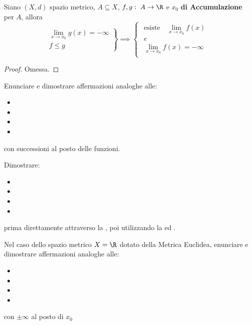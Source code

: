 \begin{proposition}
	\label{prop:f_leq_g_lim_g_meno_inf_allora_f_meno_inf}
	Siano $(X,d)$ spazio metrico, $A \subseteq X$, $f,g:\; A \to \R$ e $x_0$ \textbf{di Accumulazione} per $A$, allora
	\[
		\left.
			\begin{array}{c}
				\lim\limits_{x \to x_0} g(x) = -\infty\\
				f \leq g
			\end{array}
		\right\}
		\implies
		\begin{cases}
			\begin{array}{c}
				\text{esiste} \quad \lim\limits_{x \to x_0} f(x)\\
				e\\
				\lim\limits_{x \to x_0} f(x) = -\infty
			\end{array}
		\end{cases}
	\]
	\begin{proof}
		Omessa.
	\end{proof}
\end{proposition}
\begin{exercise}
	\label{ex:dim_prop_lim_succ}
	Enunciare e dimostrare affermazioni analoghe alle:
	\begin{itemize}[noitemsep]
		\item {}
		\item {}
		\item {}
		\item {}
	\end{itemize}
	con successioni al posto delle funzioni.
\end{exercise}
\begin{exercise}
	Dimostrare:
	\begin{itemize}[noitemsep]
		\item {}
		\item {}
		\item {}
		\item {}
	\end{itemize}
	prima direttamente attraverso la , poi utilizzando la  ed .
\end{exercise}
\begin{exercise}
	Nel caso dello spazio metrico $X = \R$ dotato della Metrica Euclidea, enunciare e dimostrare affermazioni analoghe alle:
	\begin{itemize}[noitemsep]
		\item {}
		\item {}
		\item {}
		\item {}
	\end{itemize}
	con $\pm \infty$ al posto di $x_0$
\end{exercise}

